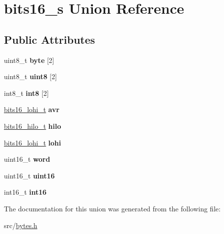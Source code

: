\hypertarget{unionbits16__s}{}\section{bits16\+\_\+s Union Reference}
\label{unionbits16__s}
\subsection*{Public Attributes}
\begin{DoxyCompactItemize}
\item 
\hypertarget{unionbits16__s_a8e70ab734bd08c67b789e0ffb1d67892}{}\label{unionbits16__s_a8e70ab734bd08c67b789e0ffb1d67892} 
uint8\+\_\+t {\bfseries byte} \mbox{[}2\mbox{]}
\item 
\hypertarget{unionbits16__s_aa05d8486a82ce525c07f162c2a5d1534}{}\label{unionbits16__s_aa05d8486a82ce525c07f162c2a5d1534} 
uint8\+\_\+t {\bfseries uint8} \mbox{[}2\mbox{]}
\item 
\hypertarget{unionbits16__s_a8f4ee6dd238c821c99a5766ef0bae0e4}{}\label{unionbits16__s_a8f4ee6dd238c821c99a5766ef0bae0e4} 
int8\+\_\+t {\bfseries int8} \mbox{[}2\mbox{]}
\item 
\hypertarget{unionbits16__s_af0ebecfcbdd064f43b10f70e49b133bd}{}\label{unionbits16__s_af0ebecfcbdd064f43b10f70e49b133bd} 
\hyperlink{structbits16__lohi__s}{bits16\+\_\+lohi\+\_\+t} {\bfseries avr}
\item 
\hypertarget{unionbits16__s_a9a297f75a8f79930db07a7a458f3a4c4}{}\label{unionbits16__s_a9a297f75a8f79930db07a7a458f3a4c4} 
\hyperlink{structbits16__hilo__s}{bits16\+\_\+hilo\+\_\+t} {\bfseries hilo}
\item 
\hypertarget{unionbits16__s_abf1a2610c051d39886f4e1ea67b20502}{}\label{unionbits16__s_abf1a2610c051d39886f4e1ea67b20502} 
\hyperlink{structbits16__lohi__s}{bits16\+\_\+lohi\+\_\+t} {\bfseries lohi}
\item 
\hypertarget{unionbits16__s_affde397ef273ced95c39dcdad4b27c98}{}\label{unionbits16__s_affde397ef273ced95c39dcdad4b27c98} 
uint16\+\_\+t {\bfseries word}
\item 
\hypertarget{unionbits16__s_abf83c4c027232cd129c9c9d4f8dd0ce6}{}\label{unionbits16__s_abf83c4c027232cd129c9c9d4f8dd0ce6} 
uint16\+\_\+t {\bfseries uint16}
\item 
\hypertarget{unionbits16__s_a8be8d70895f37f5e17c483a12b98363b}{}\label{unionbits16__s_a8be8d70895f37f5e17c483a12b98363b} 
int16\+\_\+t {\bfseries int16}
\end{DoxyCompactItemize}


The documentation for this union was generated from the following file\+:\begin{DoxyCompactItemize}
\item 
src/\hyperlink{bytes_8h}{bytes.\+h}\end{DoxyCompactItemize}
